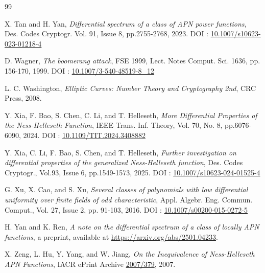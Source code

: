 \documentclass[11pt]{article}
\numberwithin{theorem}{section}
\begin{document}
\begin{thebibliography}{99}

 X. Tan and H. Yan, \emph{Differential spectrum of a class of APN power functions}, Des. Codes Cryptogr. Vol. 91, Issue 8, pp.2755-2768, 2023. DOI : \href{https://doi.org/10.1007/s10623-023-01218-4} {10.1007/s10623-023-01218-4}

 D. Wagner, \emph{The boomerang attack}, FSE 1999, Lect. Notes Comput. Sci. 1636, pp. 156-170, 1999.
DOI : \href{https://doi.org/10.1007/3-540-48519-8_12} {10.1007/3-540-48519-8\_12}

 L. C. Washington, \emph{Elliptic Curves: Number Theory and Cryptography 2nd}, CRC Press, 2008. 

 Y. Xia, F. Bao, S. Chen, C. Li, and T. Helleseth, \emph{More Differential Properties of the Ness-Helleseth Function},  IEEE Trans. Inf. Theory, Vol. 70, No. 8, pp.6076-6090, 2024.
DOI : \href{https://doi.org/10.1109/TIT.2024.3408882}{10.1109/TIT.2024.3408882}

 Y. Xia, C. Li, F. Bao, S. Chen, and T. Helleseth, \emph{Further investigation on differential properties of the generalized Ness-Helleseth function}, Des. Codes Cryptogr., Vol.93, Issue 6, pp.1549-1573, 2025.
DOI : \href{https://doi.org/10.1007/s10623-024-01525-4} {10.1007/s10623-024-01525-4}

 G. Xu, X. Cao, and S. Xu, \emph{Several classes of polynomials with low differential uniformity over finite fields of odd characteristic}, Appl. Algebr. Eng. Commun. Comput., Vol. 27, Issue 2, pp. 91-103, 2016. DOI : \href{https://doi.org/10.1007/s00200-015-0272-5}{10.1007/s00200-015-0272-5}


 H. Yan and K. Ren, \emph{A note on the differential spectrum of a class of locally APN functions}, a preprint, available at \href{https://arxiv.org/abs/2501.04233}{https://arxiv.org/abs/2501.04233}.

 X. Zeng, L. Hu, Y. Yang, and W. Jiang, \emph{On the Inequivalence of Ness-Helleseth APN Functions}, IACR ePrint Archive \href{https://eprint.iacr.org/2007/379}{2007/379}, 2007. 



\end{thebibliography}
\end{document}
